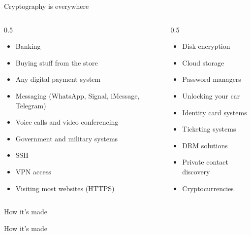 \documentclass[aspectratio=169, lualatex, handout, 10pt,dvipsnames,svgnames]{beamer} %
\begin{document}
\begin{frame}{Cryptography is everywhere}
	\begin{columns}[c]
		\begin{column}{0.5\textwidth}
			\begin{itemize}[<+->]
				\item Banking
				\item Buying stuff from the store
				\item Any digital payment system
				\item Messaging (WhatsApp, Signal, iMessage, Telegram)
				\item Voice calls and video conferencing
				\item Government and military systems
				\item SSH
				\item VPN access
				\item Visiting most websites (HTTPS)
			\end{itemize}
		\end{column}
		\begin{column}{0.5\textwidth}
			\begin{itemize}[<+->]
				\item Disk encryption
				\item Cloud storage
        \item Password managers
				\item Unlocking your car
				\item Identity card systems
				\item Ticketing systems
				\item DRM solutions
				\item Private contact discovery
				\item Cryptocurrencies
			\end{itemize}
		\end{column}
	\end{columns}
\end{frame}

\begin{frame}{How it's made}
\end{frame}

\begin{frame}{How it's made}
	\begin{center}
	\end{center}
\end{frame}
\end{document}
